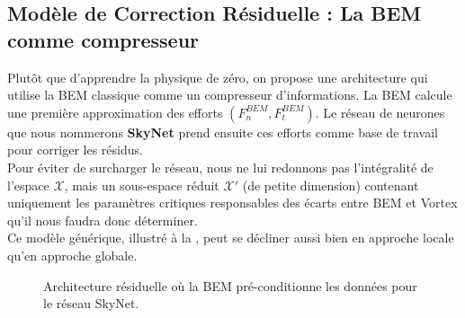 \documentclass[11pt, a4paper]{article}
\begin{document}
\subsection{Modèle de Correction Résiduelle : La BEM comme compresseur}

Plutôt que d'apprendre la physique de zéro, on propose une architecture qui utilise la BEM classique comme un compresseur d'informations. La BEM calcule une première approximation des efforts $(F_n^{BEM}, F_t^{BEM})$. Le réseau de neurones que nous nommerons \textbf{SkyNet} prend ensuite ces efforts comme base de travail pour corriger les résidus. \\

Pour éviter de surcharger le réseau, nous ne lui redonnons pas l'intégralité de l'espace $\mathcal{X}$, mais un sous-espace réduit $\mathcal{X}'$ (de petite dimension) contenant uniquement les paramètres critiques responsables des écarts entre BEM et Vortex qu'il nous faudra donc déterminer. \\

Ce modèle générique, illustré à la , peut se décliner aussi bien en approche locale qu'en approche globale.

\begin{figure}[H]
    \centering
    \caption{Architecture résiduelle où la BEM pré-conditionne les données pour le réseau SkyNet.}
    \label{fig residual_model}
\end{figure}
\end{document}
